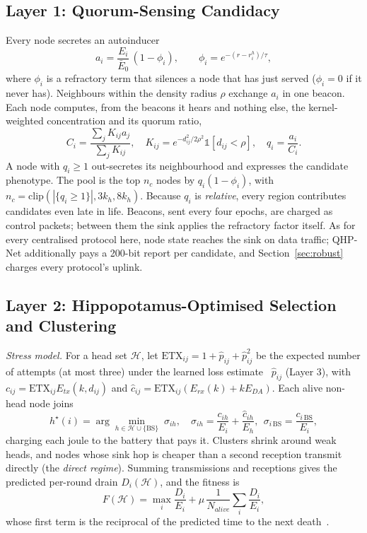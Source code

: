 \documentclass[conference]{IEEEtran}
\begin{document}
\subsection{Layer 1: Quorum-Sensing Candidacy}
Every node secretes an autoinducer~\cite{miller2001quorum}
\begin{equation}
a_i=\frac{E_i}{\bar E_0}\,(1-\phi_i),\qquad \phi_i=e^{-(r-r_i^h)/\tau},
\label{eq:secretion}
\end{equation}
where $\phi_i$ is a refractory term that silences a node that has just served ($\phi_i=0$ if it never has). Neighbours within the density radius $\rho$ exchange $a_i$ in one beacon. Each node computes, from the beacons it hears and nothing else, the kernel-weighted concentration and its quorum ratio,
\begin{equation}
C_i=\frac{\sum_j K_{ij}a_j}{\sum_j K_{ij}},\quad K_{ij}=e^{-d_{ij}^2/2\rho^2}\mathbb 1[d_{ij}<\rho],\quad q_i=\frac{a_i}{C_i}.
\label{eq:quorum}
\end{equation}
A node with $q_i\ge1$ out-secretes its neighbourhood and expresses the candidate phenotype. The pool is the top $n_c$ nodes by $q_i(1-\phi_i)$, with $n_c=\text{clip}(|\{q_i\ge1\}|,3k_h,8k_h)$. Because $q_i$ is \emph{relative}, every region contributes candidates even late in life. Beacons, sent every four epochs, are charged as control packets; between them the sink applies the refractory factor itself. As for every centralised protocol here, node state reaches the sink on data traffic; QHP-Net additionally pays a 200-bit report per candidate, and Section~\ref{sec:robust} charges every protocol's uplink.

\subsection{Layer 2: Hippopotamus-Optimised Selection and Clustering}
\emph{Stress model.} For a head set $\mathcal H$, let $\text{ETX}_{ij}=1+\hat p_{ij}+\hat p_{ij}^2$ be the expected number of attempts (at most three) under the learned loss estimate~\cite{decouto2003etx} $\hat p_{ij}$ (Layer 3), with $c_{ij}=\text{ETX}_{ij}E_{tx}(k,d_{ij})$ and $\hat c_{ij}=\text{ETX}_{ij}(E_{rx}(k)+kE_{DA})$. Each alive non-head node joins
\begin{equation}
h^\star(i)=\arg\min_{h\in\mathcal H\cup\{\text{BS}\}}\;\sigma_{ih},\quad \sigma_{ih}=\frac{c_{ih}}{E_i}+\frac{\hat c_{ih}}{E_h},\ \ \sigma_{i\,\text{BS}}=\frac{c_{i\,\text{BS}}}{E_i},
\label{eq:join}
\end{equation}
charging each joule to the battery that pays it. Clusters shrink around weak heads, and nodes whose sink hop is cheaper than a second reception transmit directly (the \emph{direct regime}). Summing transmissions and receptions gives the predicted per-round drain $D_i(\mathcal H)$, and the fitness is
\begin{equation}
F(\mathcal H)=\max_i\frac{D_i}{E_i}+\mu\,\frac{1}{N_{alive}}\sum_i\frac{D_i}{E_i},
\label{eq:fitness}
\end{equation}
whose first term is the reciprocal of the predicted time to the next death~\cite{chang2004maxlife}.
\end{document}
